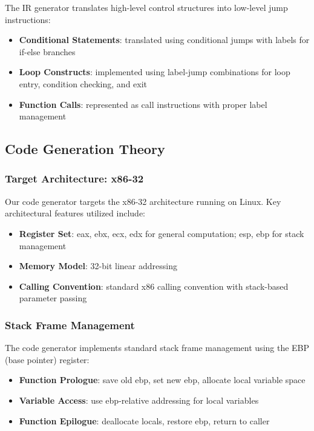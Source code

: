 \documentclass[12pt, letterpaper]{article}
\begin{document}
The IR generator translates high-level control structures into low-level jump instructions:

\begin{itemize}
    \item \textbf{Conditional Statements}: translated using conditional jumps with labels for if-else branches
    \item \textbf{Loop Constructs}: implemented using label-jump combinations for loop entry, condition checking, and exit
    \item \textbf{Function Calls}: represented as call instructions with proper label management
\end{itemize}

\subsection*{Code Generation Theory}

\subsubsection*{Target Architecture: x86-32}

Our code generator targets the x86-32 architecture running on Linux. Key architectural features utilized include:

\begin{itemize}
    \item \textbf{Register Set}: eax, ebx, ecx, edx for general computation; esp, ebp for stack management
    \item \textbf{Memory Model}: 32-bit linear addressing
    \item \textbf{Calling Convention}: standard x86 calling convention with stack-based parameter passing
\end{itemize}

\subsubsection*{Stack Frame Management}

The code generator implements standard stack frame management using the EBP (base pointer) register:

\begin{itemize}
    \item \textbf{Function Prologue}: save old ebp, set new ebp, allocate local variable space
    \item \textbf{Variable Access}: use ebp-relative addressing for local variables
    \item \textbf{Function Epilogue}: deallocate locals, restore ebp, return to caller
\end{itemize}
\end{document}
